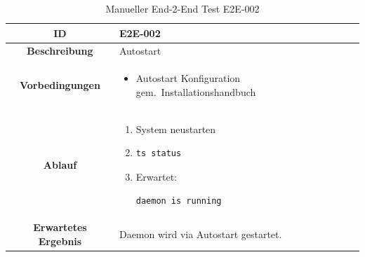 \documentclass[a4paper,12pt]{report}
\begin{document}
    \clearpage

    \begin{table}[h!]
        \centering
        \setlength{\leftmargini}{0.8cm}
        \begin{tabular}{|c|p{10cm}|}
            \hline
            \textbf{ID}                  & E2E-002                              \\ \hline
            \textbf{Beschreibung}        & Autostart                            \\ \hline
            \textbf{Vorbedingungen} &
            \begin{itemize}
                \item Autostart Konfiguration gem.\ Installationshandbuch
            \end{itemize} \\ \hline
            \textbf{Ablauf} &
            \begin{enumerate}
                \item System neustarten
                \item \begin{verbatim}ts status
                \end{verbatim}
                \item Erwartet: \begin{verbatim}daemon is running
                \end{verbatim}
            \end{enumerate} \\ \hline
            \textbf{Erwartetes Ergebnis} & Daemon wird via Autostart gestartet. \\ \hline
        \end{tabular}
        \caption{Manueller End-2-End Test E2E-002}\label{tab:e2e-2}
    \end{table}
\end{document}
